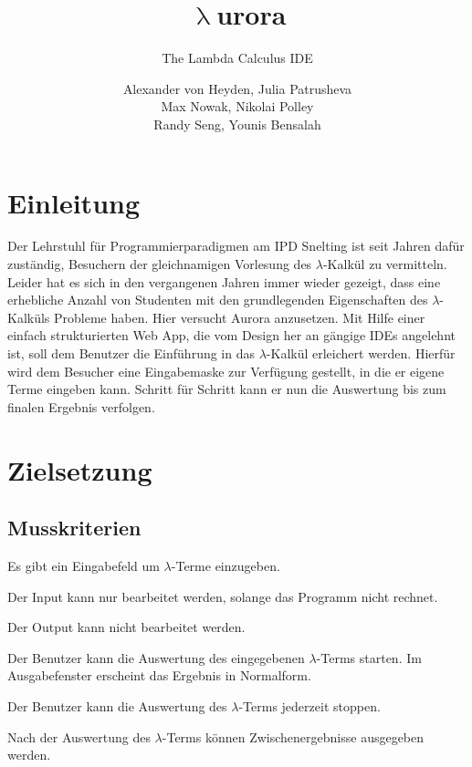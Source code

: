 \documentclass[parskip=full,11pt,twoside]{scrartcl}
\title{\textbf{$\uplambda$}urora}
\subtitle{The Lambda Calculus IDE}
\author{Alexander von Heyden, Julia Patrusheva\\
 Max Nowak, Nikolai Polley\\
 Randy Seng, Younis Bensalah}
\begin{document}
\maketitle
\newpage
\tableofcontents

\newpage
\section{Einleitung}
Der Lehrstuhl für Programmierparadigmen am IPD Snelting ist seit Jahren dafür zuständig, Besuchern der gleichnamigen Vorlesung des $\lambda$-Kalkül zu vermitteln. Leider hat es sich in den vergangenen Jahren immer wieder gezeigt, dass eine erhebliche Anzahl von Studenten mit den grundlegenden Eigenschaften des $\lambda$-Kalküls Probleme haben. Hier versucht Aurora anzusetzen. Mit Hilfe einer einfach strukturierten Web App, die vom Design her an gängige IDEs angelehnt ist, soll dem Benutzer die Einführung in das $\lambda$-Kalkül erleichert werden. Hierfür wird dem Besucher eine Eingabemaske zur Verfügung gestellt, in die er eigene Terme eingeben kann. Schritt für Schritt kann er nun die Auswertung bis zum finalen Ergebnis verfolgen.


\newpage
\section{Zielsetzung}


\subsection{Musskriterien}

Es gibt ein Eingabefeld um $\lambda$-Terme einzugeben.

Der Input kann nur bearbeitet werden, solange das Programm nicht rechnet.

Der Output kann nicht bearbeitet werden.

Der Benutzer kann die Auswertung des eingegebenen $\lambda$-Terms starten. Im Ausgabefenster erscheint das Ergebnis in Normalform.

Der Benutzer kann die Auswertung des $\lambda$-Terms jederzeit stoppen.

Nach der Auswertung des $\lambda$-Terms können Zwischenergebnisse ausgegeben werden.
\end{document}
